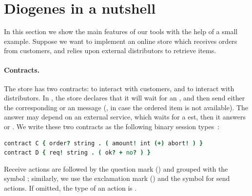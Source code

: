 \section{Diogenes in a nutshell}

In this section we show the main features of our tools
with the help of a small example.
Suppose we want to implement an online store which 
receives orders from customers,
and relies upon external distributors to retrieve items.

\paragraph{Contracts.}
The store has two contracts:
 to interact with customers, and
 to interact with distributors.
In , the store declares that it will wait for an ,
and then send either the corresponding  or an  message
(\eg, in case the ordered item is not available).
The answer may depend on an external service, 
which waits for a est, then it answers  or .
% 
We write these two contracts as the following 
binary session types~\cite{Honda98esop}:
% 
\begin{lstlisting}[language=coco,basicstyle=\scriptsize\ttfamily]
contract C { order? string . ( amount! int (+) abort! ) }
contract D { req! string . ( ok? + no? ) }
\end{lstlisting}
Receive actions are followed by the question mark () and grouped
with the symbol \code{+}; similarly, we use the
exclamation mark (\code{!}) and the symbol \code{(+)} for
send actions. If omitted, the type of an action is .


